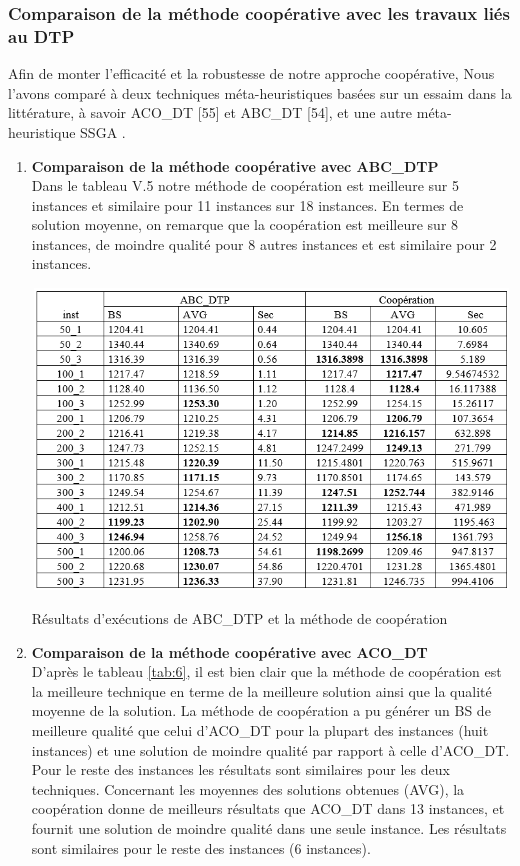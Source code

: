 \subsubsection{Comparaison de la méthode coopérative avec les travaux liés au DTP}
Afin de monter l’efficacité et la robustesse de notre approche coopérative, Nous l’avons comparé à deux techniques méta-heuristiques basées sur un essaim dans la littérature, à savoir ACO\_DT [55] et ABC\_DT [54], et une autre méta-heuristique SSGA \cite{sundar2014steady} .


\begin{enumerate}[label=\alph*)]
	\item \textbf{Comparaison de  la méthode coopérative avec ABC\_DTP}\\
	Dans le tableau V.5 notre méthode de coopération est meilleure sur 5 instances et similaire pour 11 instances sur 18 instances. En termes de solution moyenne, on remarque que la coopération est meilleure sur 8 instances, de moindre qualité pour 8 autres instances et est similaire pour 2 instances.
	
\begin{table}[H]
	\includegraphics[width=15cm,height=8cm]{Chap5/t5.png}
	\caption{Résultats d’exécutions de ABC\_DTP et la méthode de coopération}
	\label{tab:5}
\end{table}

	\item \textbf{Comparaison de  la méthode coopérative avec ACO\_DT}\\
	D’après le tableau \ref{tab:6}, il est bien clair que la méthode de coopération est la meilleure technique en terme de la meilleure solution ainsi que la qualité moyenne de la solution. La méthode de coopération a pu générer un BS de meilleure qualité que celui d’ACO\_DT pour la plupart des instances (huit instances) et une solution de moindre qualité par rapport à celle d’ACO\_DT. Pour le reste des instances les résultats sont similaires pour les deux techniques. Concernant les moyennes des solutions obtenues (AVG), la coopération donne de meilleurs résultats que ACO\_DT dans 13 instances, et fournit une solution de moindre qualité dans une seule instance. Les résultats sont similaires pour le reste des instances (6 instances).
	

\end{enumerate}
